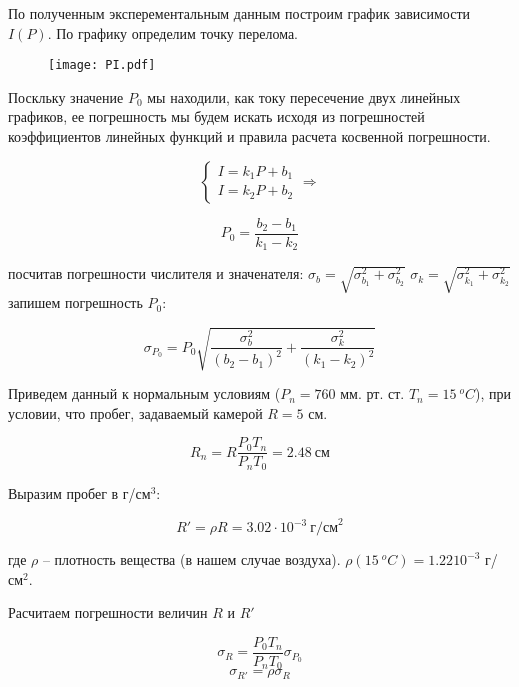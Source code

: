     

    По полученным эксперементальным данным построим график зависимости $I(P)$. По графику определим точку перелома.

    \begin{figure}
        \centering
        \texttt{[image: PI.pdf]}
        \caption{}
        \label{fig:1}
    \end{figure}

    \begin{center}
    \end{center}
    
    Поскльку значение $P_0$ мы находили, как току пересечение двух линейных графиков, ее погрешность
    мы будем искать исходя из погрешностей коэффициентов линейных функций и правила расчета косвенной погрешности.

    \begin{equation*}
        \begin{cases}
            I = k_1 P + b_1 \\
            I = k_2 P + b_2
        \end{cases}
        \Rightarrow
    \end{equation*}

    \[ P_0 = \frac{b_2 - b_1}{k_1 - k_2} \]

    посчитав погрешности числителя и значенателя: $\sigma_b = \sqrt{\sigma_{b_1}^2 + \sigma_{b_2}^2}$
    $\sigma_k = \sqrt{\sigma_{k_1}^2 + \sigma_{k_2}^2}$ запишем погрешность $P_0$:

    \[ \sigma_{P_0} = P_0 \sqrt{\frac{\sigma_b^2}{(b_2 - b_1)^2} + \frac{\sigma_k^2}{(k_1 - k_2)^2}} \]

    Приведем данный к нормальным условиям ($P_n = 760$ мм. рт. ст. $T_n = 15 ~ ^oC$), при условии,
    что пробег, задаваемый камерой $R = 5$ см.

    \[ R_n = R \frac{P_0 T_n}{P_n T_0} = 2.48 ~ \text{см} \]

    Выразим пробег в г/см$^3$:

    \[ R' = \rho R = 3.02 \cdot 10^{-3} ~ \text{г/см}^2 \]

    где $\rho$ -- плотность вещества (в нашем случае воздуха). $\rho(15 ~ ^oC) = 1.22 10^{-3}$ г/см$^2$.

    Расчитаем погрешности величин $R$ и $R'$

    \[ \sigma_R = \frac{P_0 T_n}{P_n T_0} \sigma_{P_0} \]
    \[ \sigma_{R'} = \rho \sigma_R \]

